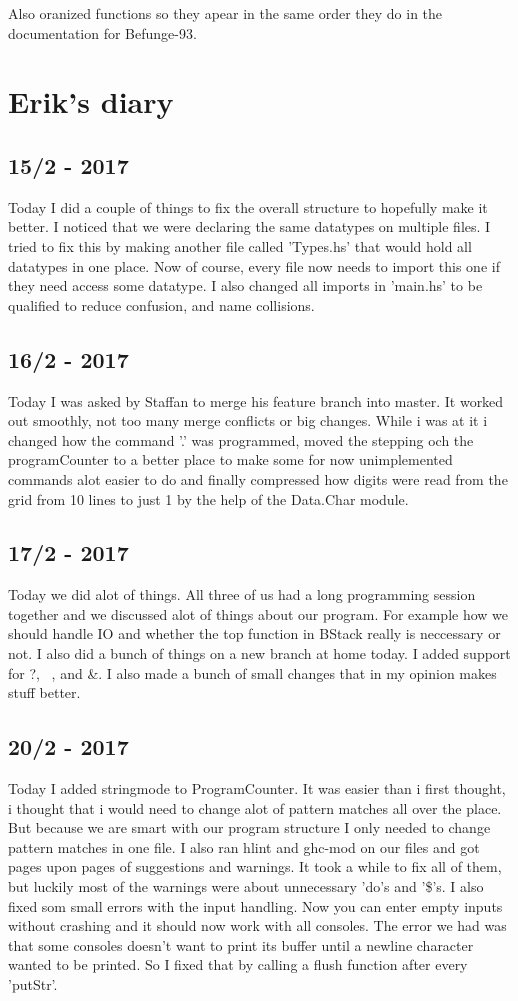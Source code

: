 \documentclass[12pt, a4paper]{article}
\begin{document}
Also oranized functions so they apear in the same order they do in the documentation for Befunge-93.

\section*{Erik's diary}

\subsection*{15/2 - 2017}
Today I did a couple of things to fix the overall structure to hopefully make it better.
I noticed that we were declaring the same datatypes on multiple files. I tried
to fix this by making another file called 'Types.hs' that would hold all datatypes
in one place. Now of course, every file now needs to import this one if they need
access some datatype.
I also changed all imports in 'main.hs' to be qualified to reduce confusion, and
name collisions.

\subsection*{16/2 - 2017}
Today I was asked by Staffan to merge his feature branch into master. It worked out
smoothly, not too many merge conflicts or big changes. While i was at it i changed
how the command '.' was programmed, moved the stepping och the programCounter to
a better place to make some for now unimplemented commands alot easier to do
and finally compressed how digits were read from the grid from 10 lines to just 1
by the help of the Data.Char module.

\subsection*{17/2 - 2017}
Today we did alot of things. All three of us had a long programming session together
and we discussed alot of things about our program. For example how we should handle IO
and whether the top function in BStack really is neccessary or not.
I also did a bunch of things on a new branch at home today. I added support for
?, ~, and \&. I also made a bunch of small changes that in my opinion makes stuff better.

\subsection*{20/2 - 2017}
Today I added stringmode to ProgramCounter. It was easier than i first thought,
i thought that i would need to change alot of pattern matches all over the place.
But because we are smart with our program structure I only needed to change
pattern matches in one file. I also ran hlint and ghc-mod on our files and got
pages upon pages of suggestions and warnings. It took a while to fix all of them,
but luckily most of the warnings were about unnecessary 'do's and '\$'s. I also fixed
som small errors with the input handling. Now you can enter empty inputs without
crashing and it should now work with all consoles. The error we had was that some
consoles doesn't want to print its buffer until a newline character wanted to be printed.
So I fixed that by calling a flush function after every 'putStr'.
\end{document}
